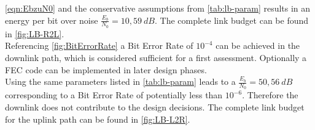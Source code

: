 \autoref{eqn:EbzuN0} and the conservative assumptions from \autoref{tab:lb-param} results in an energy per bit over noise $\frac{{E}_{b}}{{N}_{0}} = 10,59\ dB$. The complete link budget can be found in \autoref{fig:LB-R2L}. \\
Referencing \autoref{fig:BitErrorRate} a Bit Error Rate of $10^{-4}$ can be achieved in the downlink path, which is considered sufficient for a first assessment. Optionally a FEC code can be implemented in later design phases.\\

Using the same parameters listed in \autoref{tab:lb-param} leads to a $\frac{{E}_{b}}{{N}_{0}} = 50,56\ dB$ corresponding to a Bit Error Rate of potentially less than $10^{-6}$. Therefore the downlink does not contribute to the design decisions. The complete link budget for the uplink path can be found in \autoref{fig:LB-L2R}.


